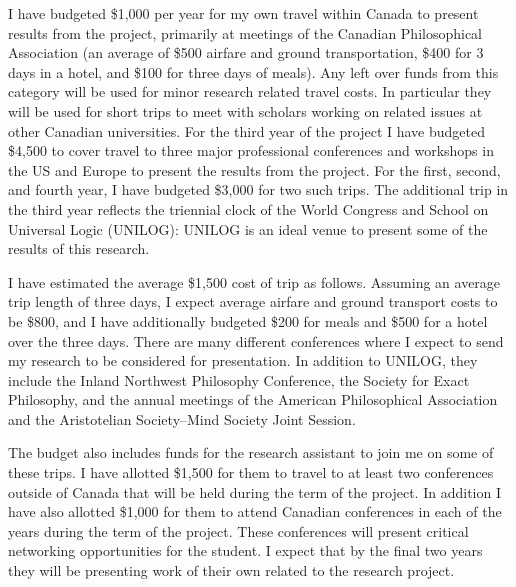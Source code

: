 \documentclass[12pt]{article}
\begin{document}
I have budgeted \$1,000 per year for my own travel within Canada to present results from the project, primarily at meetings of the Canadian Philosophical Association (an average of \$500 airfare and ground transportation, \$400 for 3 days in a hotel, and \$100 for three days of meals). Any left over funds from this category will be used for minor research related travel costs. In particular they will be used for short trips to meet with scholars working on related issues at other Canadian universities. For the third year of the project I have budgeted \$4,500 to cover travel to three major professional conferences and workshops in the US and Europe to present the results from the project. For the first, second, and fourth year, I have budgeted \$3,000 for two such trips. The additional trip in the third year reflects the triennial clock of the World Congress and School on Universal Logic (UNILOG): UNILOG is an ideal venue to present some of the results of this research.
 
I have estimated the average \$1,500 cost of trip as follows. Assuming an average trip length of three days, I expect average airfare and ground transport costs to be \$800, and I have additionally budgeted \$200 for meals and \$500 for a hotel over the three days. There are many different conferences where I expect to send my research to be considered for presentation. In addition to UNILOG, they include the Inland Northwest Philosophy Conference, the Society for Exact Philosophy, and the annual meetings of the American Philosophical Association and the Aristotelian Society--Mind Society Joint Session.

The budget also includes funds for the research assistant to join me on some of these trips. I have allotted \$1,500 for them to travel to at least two conferences outside of Canada that will be held during the term of the project. In addition I have also allotted \$1,000 for them to attend Canadian conferences in each of the years during the term of the project. These conferences will present critical networking opportunities for the student. I expect that by the final two years they will be presenting work of their own related to the research project.

 
\end{document}
